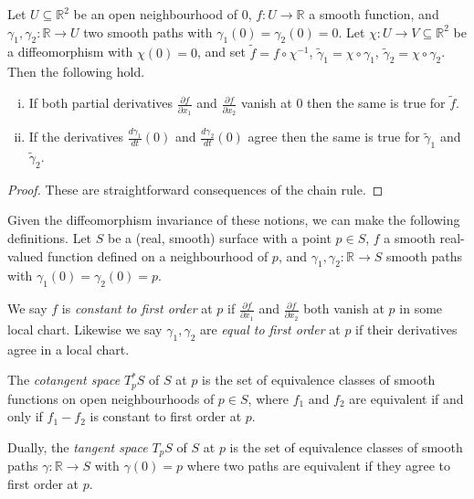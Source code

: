 \begin{lemma}
    Let \(U\subseteq \mathbb{R}^2\) be an open neighbourhood of \(0\),
    \(f:U\to\mathbb{R}\) a smooth function, and
    \(\gamma_1,\gamma_2:\mathbb{R}\to U\) two smooth paths with
    \(\gamma_1(0)=\gamma_2(0)=0\). Let \(\chi:U\to V\subseteq \mathbb{R}^2\) be
    a diffeomorphism with \(\chi(0)=0\), and set \(\tilde{f}=f\circ \chi^{-1}\),
    \(\tilde{\gamma}_1=\chi\circ \gamma_1\), \(\tilde{\gamma}_2=\chi\circ
    \gamma_2\). Then the following hold.
    \begin{enumerate}[(i)]
        \item If both partial derivatives \(\frac{\partial f}{\partial x_1}\)
        and \(\frac{\partial f}{\partial x_2}\) vanish at \(0\) then the same
        is true for \(\tilde{f}\).
        \item If the derivatives \(\frac{d\gamma_1}{dt}(0)\) and
        \(\frac{d\gamma_2}{dt}(0)\) agree then the same is true for
        \(\tilde{\gamma}_1\) and \(\tilde{\gamma}_2\).
    \end{enumerate}
    \begin{proof}
        These are straightforward consequences of the chain rule.
    \end{proof}
\end{lemma}

Given the diffeomorphism invariance of these notions, we can make the following
definitions. Let \(S\) be a (real, smooth) surface with a point \(p\in S\),
\(f\)  a smooth real-valued function defined on a neighbourhood of \(p\), and
\(\gamma_1,\gamma_2: \mathbb{R}\to S\) smooth paths with
\(\gamma_1(0)=\gamma_2(0)=p\).

\begin{definition}
    We say \(f\) is \textit{constant to first order} at \(p\) if \(\frac{\partial
    f}{\partial x_1}\) and \(\frac{\partial f}{\partial x_2}\) both vanish at
    \(p\) in some local chart. Likewise we say \(\gamma_1,\gamma_2\) are
    \textit{equal to first order} at \(p\) if their derivatives agree in a
    local chart.
\end{definition}

\begin{definition}
    The \textit{cotangent space} \(T^\ast_p S\)  of \(S\) at \(p\) is the set of equivalence
    classes of smooth functions on open neighbourhoods of \(p\in S\), where
    \(f_1\) and \(f_2\) are equivalent if and only if \(f_1-f_2\) is constant
    to first order at \(p\).

    Dually, the \textit{tangent space} \(T_pS\)  of \(S\) at \(p\) is the set of
    equivalence classes of smooth paths \(\gamma:\mathbb{R}\to S\) with
    \(\gamma(0)=p\) where two paths are equivalent if they agree to first
    order at \(p\).
\end{definition}

